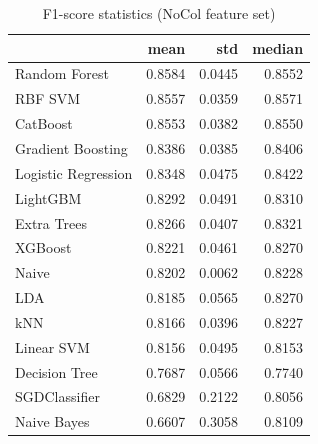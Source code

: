 \begin{table}
\caption{F1-score statistics (NoCol feature set)}
\label{tab:f1_NoCol_stats}
\begin{tabular}{lrrr}
\toprule
 & mean & std & median \\
\midrule
Random Forest & 0.8584 & 0.0445 & 0.8552 \\
RBF SVM & 0.8557 & 0.0359 & 0.8571 \\
CatBoost & 0.8553 & 0.0382 & 0.8550 \\
Gradient Boosting & 0.8386 & 0.0385 & 0.8406 \\
Logistic Regression & 0.8348 & 0.0475 & 0.8422 \\
LightGBM & 0.8292 & 0.0491 & 0.8310 \\
Extra Trees & 0.8266 & 0.0407 & 0.8321 \\
XGBoost & 0.8221 & 0.0461 & 0.8270 \\
Naive & 0.8202 & 0.0062 & 0.8228 \\
LDA & 0.8185 & 0.0565 & 0.8270 \\
kNN & 0.8166 & 0.0396 & 0.8227 \\
Linear SVM & 0.8156 & 0.0495 & 0.8153 \\
Decision Tree & 0.7687 & 0.0566 & 0.7740 \\
SGDClassifier & 0.6829 & 0.2122 & 0.8056 \\
Naive Bayes & 0.6607 & 0.3058 & 0.8109 \\
\bottomrule
\end{tabular}
\end{table}
